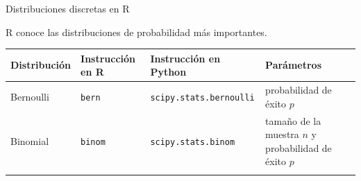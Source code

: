 \documentclass[
  ignorenonframetext,
]{beamer}
\begin{document}
\begin{frame}[fragile]{Distribuciones discretas en R}
\protect\hypertarget{distribuciones-discretas-en-r}{}

R conoce las distribuciones de probabilidad más importantes.

\begin{longtable}[]{@{}llll@{}}
\toprule
\begin{minipage}[b]{0.22\columnwidth}\raggedright
Distribución\strut
\end{minipage} & \begin{minipage}[b]{0.22\columnwidth}\raggedright
Instrucción en R\strut
\end{minipage} & \begin{minipage}[b]{0.22\columnwidth}\raggedright
Instrucción en Python\strut
\end{minipage} & \begin{minipage}[b]{0.22\columnwidth}\raggedright
Parámetros\strut
\end{minipage}\tabularnewline
\midrule
\endhead
\begin{minipage}[t]{0.22\columnwidth}\raggedright
Bernoulli\strut
\end{minipage} & \begin{minipage}[t]{0.22\columnwidth}\raggedright
\texttt{bern}\strut
\end{minipage} & \begin{minipage}[t]{0.22\columnwidth}\raggedright
\texttt{scipy.stats.bernoulli}\strut
\end{minipage} & \begin{minipage}[t]{0.22\columnwidth}\raggedright
probabilidad de éxito \(p\)\strut
\end{minipage}\tabularnewline
\begin{minipage}[t]{0.22\columnwidth}\raggedright
Binomial\strut
\end{minipage} & \begin{minipage}[t]{0.22\columnwidth}\raggedright
\texttt{binom}\strut
\end{minipage} & \begin{minipage}[t]{0.22\columnwidth}\raggedright
\texttt{scipy.stats.binom}\strut
\end{minipage} & \begin{minipage}[t]{0.22\columnwidth}\raggedright
tamaño de la muestra \(n\) y probabilidad de éxito \(p\)\strut
\end{minipage}\tabularnewline
\begin{minipage}[t]{0.22\columnwidth}\raggedright

\end{minipage}
\end{longtable}
\end{frame}
\end{document}
